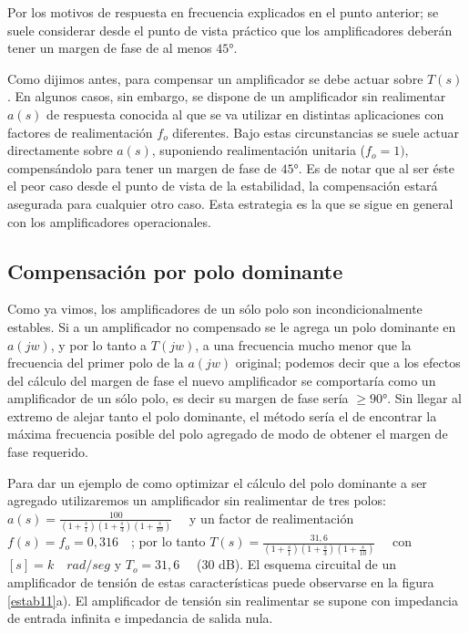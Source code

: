 Por los motivos de respuesta en frecuencia explicados en el punto
anterior; se suele considerar desde el punto de vista práctico que
los amplificadores deberán tener un margen de fase de al menos
$45°$.

Como dijimos antes, para compensar un amplificador se debe actuar
sobre $T(s)$. En algunos casos, sin embargo, se dispone de un
amplificador sin realimentar $a(s)$ de respuesta conocida al que se
va utilizar en distintas aplicaciones con factores de realimentación
$f_o$ diferentes. Bajo estas circunstancias se suele actuar
directamente sobre $a(s)$, suponiendo realimentación unitaria
($f_o=1)$, compensándolo para tener un margen de fase de $45°$. Es
de notar que al ser éste el peor caso desde el punto de vista de la
estabilidad, la compensación estará asegurada para cualquier otro
caso. Esta estrategia es la que se sigue en general con los
amplificadores operacionales.

\subsection{Compensación por polo dominante}\label{ejemplo1}

\hspace{10pt} Como ya vimos, los amplificadores de un sólo polo son
incondicionalmente estables. Si a un amplificador no compensado se
le agrega un polo dominante en $a(jw)$, y por lo tanto a $T(jw)$, a
una frecuencia mucho menor que la frecuencia del primer polo de la
$a(jw)$ original; podemos decir que a los efectos del cálculo del
margen de fase el nuevo amplificador se comportaría como un
amplificador de un sólo polo, es decir su margen de fase sería $\geq
90°$. Sin llegar al extremo de alejar tanto el polo dominante, el
método sería el de encontrar la máxima frecuencia posible del polo
agregado de modo de obtener el margen de fase requerido.

Para dar un ejemplo de como optimizar el cálculo del polo dominante
a ser agregado utilizaremos un amplificador sin realimentar de tres
polos: $a(s)=\frac{\displaystyle 100}{\displaystyle
	(1+\frac{s}{1})(1+\frac{\displaystyle s}{\displaystyle
		3})(1+\frac{\displaystyle s}{\displaystyle 10})}\quad$ y un factor
de realimentación $f(s)=f_o=0,316\quad$; por lo tanto
$T(s)=\frac{\displaystyle 31,6}{\displaystyle (1+\frac{\displaystyle
		s}{\displaystyle 1})(1+\frac{\displaystyle s}{\displaystyle
		3})(1+\frac{\displaystyle s}{\displaystyle 10})}\quad$ con $[s]=
k\quad rad/seg $ y $T_o=31,6\quad$ (30 dB). El esquema circuital de
un amplificador de tensión de estas características puede observarse
en la figura \ref{estab11}a). El amplificador de tensión sin
realimentar se supone con impedancia de entrada infinita e
impedancia de salida nula.

